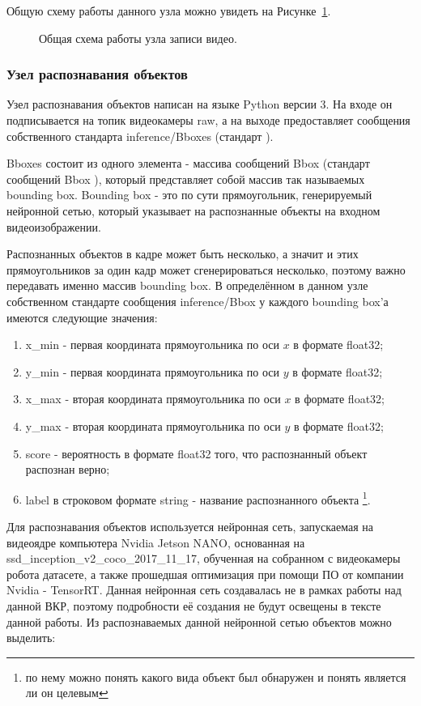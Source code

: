 Общую схему работы данного узла можно увидеть на Рисунке~\ref{fig:node-recorder}.

\begin{figure}[ht]
  \caption{Общая схема работы узла записи видео.}\label{fig:node-recorder}
\end{figure}

\subsubsection{Узел распознавания объектов}
Узел распознавания объектов написан на языке Python версии 3. На входе он подписывается на топик видеокамеры raw, а на выходе предоставляет сообщения собственного стандарта inference/Bboxes (стандарт ). 

Bboxes состоит из одного элемента - массива сообщений Bbox (стандарт сообщений Bbox ), который представляет собой массив так называемых bounding box. Bounding box - это по сути прямоугольник, генерируемый нейронной сетью, который указывает на распознанные объекты на входном видеоизображении. 

Распознанных объектов в кадре может быть несколько, а значит и этих прямоугольников за один кадр может сгенерироваться несколько, поэтому важно передавать именно массив bounding box. В определённом в данном узле собственном стандарте сообщения inference/Bbox у каждого bounding box'а имеются следующие значения:

\begin{enumerate}
\item x\_min - первая координата прямоугольника по оси $x$ в формате float32;
\item y\_min - первая координата прямоугольника по оси $y$ в формате float32;
\item x\_max - вторая координата прямоугольника по оси $x$ в формате float32;
\item y\_max - вторая координата прямоугольника по оси $y$ в формате float32;
\item score - вероятность в формате float32 того, что распознанный объект распознан верно;
\item label в строковом формате string - название распознанного объекта \footnote{по нему можно понять какого вида объект был обнаружен и понять является ли он целевым}.
\end{enumerate}

Для распознавания объектов используется нейронная сеть, запускаемая на видеоядре компьютера Nvidia Jetson NANO, основанная на ssd\_inception\_v2\_coco\_2017\_11\_17, обученная на собранном с видеокамеры робота датасете, а также прошедшая оптимизация при помощи ПО от компании Nvidia - TensorRT. Данная нейронная сеть создавалась не в рамках работы над данной ВКР, поэтому подробности её создания не будут освещены в тексте данной работы. Из распознаваемых данной нейронной сетью объектов можно выделить:

